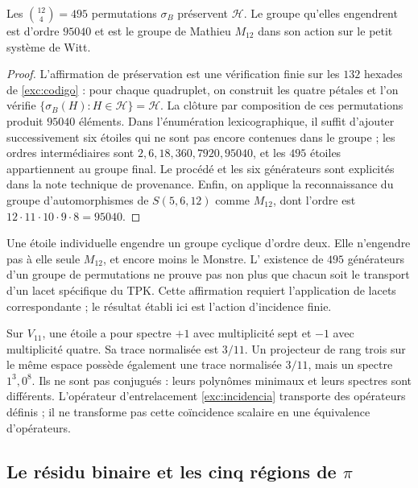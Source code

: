 \begin{proposition}
\label{exc:m12}
Les $\binom{12}4=495$ permutations $\sigma_B$ préservent $\mathcal H$.
Le groupe qu'elles engendrent est d'ordre $95040$ et est le groupe de Mathieu
$M_{12}$ dans son action sur le petit système de Witt.
\end{proposition}

\begin{proof}
L’affirmation de préservation est une vérification finie sur les
$132$ hexades de \eqref{exc:codigo} : pour chaque quadruplet, on construit
les quatre pétales et l’on vérifie
$\{\sigma_B(H):H\in\mathcal H\}=\mathcal H$.
La clôture par composition de ces permutations produit $95040$
éléments. Dans l’énumération lexicographique, il suffit d’ajouter successivement
six étoiles qui ne sont pas encore contenues dans le groupe ; les ordres intermédiaires
sont $2,6,18,360,7920,95040$, et les $495$ étoiles appartiennent au groupe
final. Le procédé et les six générateurs sont explicités dans
la note technique de provenance. Enfin, on applique la reconnaissance
du groupe d’automorphismes de $S(5,6,12)$ comme $M_{12}$, dont l’ordre est
$12\cdot11\cdot10\cdot9\cdot8=95040$.
\end{proof}

Une étoile individuelle engendre un groupe cyclique d'ordre deux. Elle
n'engendre pas à elle seule $M_{12}$, et encore moins le Monstre. L'
existence de $495$ générateurs d'un groupe de permutations ne prouve pas non plus que
chacun soit le transport d'un lacet spécifique du TPK. Cette affirmation
requiert l'application de lacets correspondante ; le résultat établi ici
est l'action d'incidence finie.

\begin{remark}
Sur $V_{11}$, une étoile a pour spectre $+1$ avec multiplicité sept
et $-1$ avec multiplicité quatre. Sa trace normalisée est $3/11$.
Un projecteur de rang trois sur le même espace possède également une trace
normalisée $3/11$, mais un spectre $1^3,0^8$. Ils ne sont pas conjugués : leurs
polynômes minimaux et leurs spectres sont différents. L'opérateur d'entrelacement
\eqref{exc:incidencia} transporte des opérateurs définis ; il ne transforme pas
cette coïncidence scalaire en une équivalence d'opérateurs.
\end{remark}

\subsection{Le résidu binaire et les cinq régions de \texorpdfstring{$\pi$}{pi}}
\label{exc:cinco-regiones}

